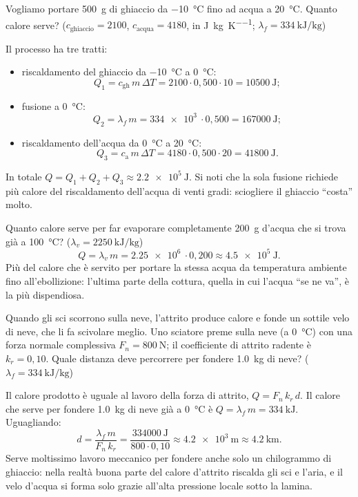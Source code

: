 \begin{testexample}
Vogliamo portare \SI{500}{\gram} di ghiaccio da \SI{-10}{\celsius} fino ad acqua a \SI{20}{\celsius}. Quanto calore serve? ($c_{\text{ghiaccio}} = 2100$, $c_{\text{acqua}} = 4180$, in \si{\joule\per\kilogram\per\kelvin}; $\lambda_f = \SI{334}{\kilo\joule\per\kilogram}$)

Il processo ha tre tratti:
\begin{itemize}
    \item riscaldamento del ghiaccio da \SI{-10}{\celsius} a \SI{0}{\celsius}:
    \[ Q_1 = c_{\text{gh}}\,m\,\Delta T = 2100 \cdot 0{,}500 \cdot 10 = \SI{10500}{\joule}; \]
    \item fusione a \SI{0}{\celsius}:
    \[ Q_2 = \lambda_f\,m = \SI{334e3}{} \cdot 0{,}500 = \SI{167000}{\joule}; \]
    \item riscaldamento dell'acqua da \SI{0}{\celsius} a \SI{20}{\celsius}:
    \[ Q_3 = c_{\text{a}}\,m\,\Delta T = 4180 \cdot 0{,}500 \cdot 20 = \SI{41800}{\joule}. \]
\end{itemize}
In totale $Q = Q_1 + Q_2 + Q_3 \approx \SI{2,2e5}{\joule}$. Si noti che la sola fusione richiede più calore del riscaldamento dell'acqua di venti gradi: sciogliere il ghiaccio ``costa'' molto.
\end{testexample}

\begin{testexample}
Quanto calore serve per far evaporare completamente \SI{200}{\gram} d'acqua che si trova già a \SI{100}{\celsius}? ($\lambda_v = \SI{2250}{\kilo\joule\per\kilogram}$)
\[ Q = \lambda_v\,m = \SI{2,25e6}{} \cdot 0{,}200 \approx \SI{4,5e5}{\joule}. \]
Più del calore che è servito per portare la stessa acqua da temperatura ambiente fino all'ebollizione: l'ultima parte della cottura, quella in cui l'acqua ``se ne va'', è la più dispendiosa.
\end{testexample}

\begin{testexample}
Quando gli sci scorrono sulla neve, l'attrito produce calore e fonde un sottile velo di neve, che li fa scivolare meglio. Uno sciatore preme sulla neve (a \SI{0}{\celsius}) con una forza normale complessiva $F_n = \SI{800}{\newton}$; il coefficiente di attrito radente è $k_r = 0{,}10$. Quale distanza deve percorrere per fondere \SI{1,0}{\kilogram} di neve? ($\lambda_f = \SI{334}{\kilo\joule\per\kilogram}$)

Il calore prodotto è uguale al lavoro della forza di attrito, $Q = F_n\,k_r\,d$. Il calore che serve per fondere \SI{1,0}{\kilogram} di neve già a \SI{0}{\celsius} è $Q = \lambda_f\,m = \SI{334}{\kilo\joule}$. Uguagliando:
\[ d = \frac{\lambda_f\,m}{F_n\,k_r} = \frac{\SI{334000}{\joule}}{800 \cdot 0{,}10} \approx \SI{4,2e3}{\metre} \approx \SI{4,2}{\kilo\metre}. \]
Serve moltissimo lavoro meccanico per fondere anche solo un chilogrammo di ghiaccio: nella realtà buona parte del calore d'attrito riscalda gli sci e l'aria, e il velo d'acqua si forma solo grazie all'alta pressione locale sotto la lamina.
\end{testexample}

